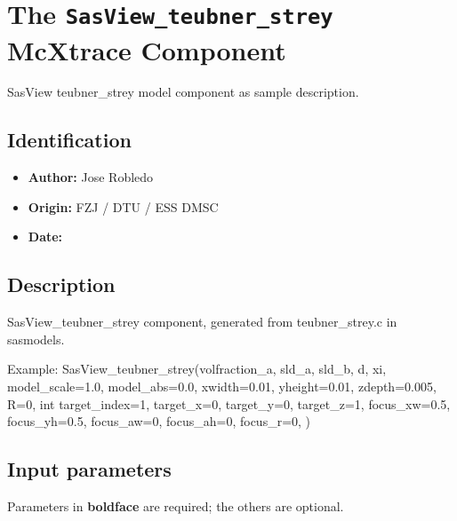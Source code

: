\section{The \texttt{SasView\_teubner\_strey} McXtrace Component}
SasView teubner\_strey model component as sample description.

\subsection*{Identification}
\begin{itemize}
  \item \textbf{Author:} Jose Robledo
  \item \textbf{Origin:} FZJ / DTU / ESS DMSC
  \item \textbf{Date:} 
\end{itemize}

\subsection*{Description}
SasView\_teubner\_strey component, generated from teubner\_strey.c in sasmodels.

Example: SasView\_teubner\_strey(volfraction\_a, sld\_a, sld\_b, d, xi, model\_scale=1.0, model\_abs=0.0, xwidth=0.01, yheight=0.01, zdepth=0.005, R=0, int target\_index=1, target\_x=0, target\_y=0, target\_z=1, focus\_xw=0.5, focus\_yh=0.5, focus\_aw=0, focus\_ah=0, focus\_r=0, )

\subsection*{Input parameters}
Parameters in \textbf{boldface} are required; the others are optional.

